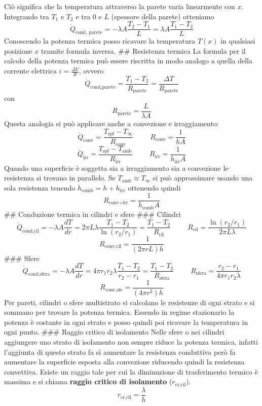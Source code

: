 Ciò significa che la temperatura attraverso la parete varia linearmente
con \(x\). Integrando tra \(T_1\) e \(T_2\) e tra \(0\) e \(L\)
(spessore della parete) otteniamo
\[\dot Q_\text{cond, parete}=-\lambda A\frac{T_2-T_1}{L}=\lambda A\frac{T_1-T_2}{L}\]
Conoscendo la potenza termica posso ricavare la temperatura \(T(x)\) in
qualsiasi posizione \(x\) tramite formula inversa. \#\# Resistenza
termica La formula per il calcolo della potenza termica può essere
riscritta in modo analogo a quella della corrente elettrica
\(i=\frac{\Delta V}{R}\), ovvero
\[\dot Q_\text{cond,parete}=\frac{T_1-T_2}{R_\text{parete}}=\frac{\Delta T}{R_\text{parete}}\]
con \[R_\text{parete}=\frac{L}{\lambda A}\] Questa analogia si può
applicare anche a convezione e irraggiamento:
\[\dot Q_\text{conv}=\frac{T_\text{spf}-T_\infty}{R_\text{conv}}\hspace{1cm}R_\text{conv}=\frac{1}{hA}\]
\[\dot Q_\text{irr}=\frac{T_\text{spf}-T_\text{amb}}{R_\text{irr}}\hspace{1cm} R_\text{irr}=\frac{1}{h_\text{irr}A}\]
Quando una superficie è soggetta sia a irraggiamento sia a convezione le
resistenza si trovano in parallelo. Se \(T_\text{amb} \approx T_\infty\)
si può approssimare usando una sola resistenza tenendo
\(h_\text{comb}=h+h_\text{irr}\) ottenendo quindi
\[R_\text{conv+irr}=\frac{1}{h_\text{comb}A}\] \#\# Conduzione termica
in cilindri e sfere \#\#\# Cilindri
\[\dot Q_\text{cond,cil}=-\lambda A\frac{dT}{dr}=2\pi L\lambda\frac{T_1-T_2}{\ln{(r_2/r_1)}}=\frac{T_1-T_2}{R_\text{cil}}\hspace{1cm}R_\text{cil}=\frac{\ln{(r_2/r_1)}}{2\pi L\lambda}\]
\[R_\text{conv,cil}=\frac{1}{(2\pi rL)h}\] \#\#\# Sfere
\[\dot Q_\text{cond,sfera}=-\lambda A\frac{dT}{dr}=4\pi r_1r_2\lambda\frac{T_1-T_2}{r_2-r_1}=\frac{T_1-T_2}{R_\text{sfera}}\hspace{1cm}R_\text{sfera}=\frac{r_2-r_1}{4\pi r_1r_2\lambda}\]
\[R_\text{conv,sfe}=\frac{1}{(4\pi r^2)h}\] Per pareti, cilindri o sfere
multistrato si calcolano le resistenze di ogni strato e si sommano per
trovare la potenza termica. Essendo in regime stazionario la potenza è
costante in ogni strato e posso quindi poi ricavare la temperatura in
ogni punto. \#\#\# Raggio critico di isolamento Nelle sfere o nei
cilindri aggiungere uno strato di isolamento non sempre riduce la
potenza termica, infatti l'aggiunta di questo strato fa sì aumentare la
resistenza conduttiva però fa aumentare la superficie esposta alla
convezione riducendo quindi la resistenza convettiva. Esiste un raggio
tale per cui la diminuzione di trasferimento termico è massima e si
chiama \textbf{raggio critico di isolamento} (\(r_\text{cr,cil}\)).
\[r_\text{cr,cil}=\frac{\lambda}{h}\]
